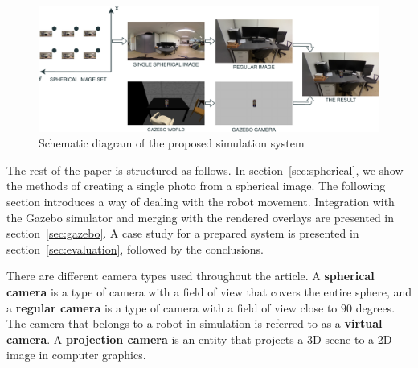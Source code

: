\documentclass{svproc}
\begin{document}
\begin{figure}[ht!]
\includegraphics[width=\textwidth]{img/drawio/flow.pdf}
\caption{Schematic diagram of the proposed simulation system}
\label{fig:flow}
\end{figure}

The rest of the paper is structured as follows. In section~\ref{sec:spherical}, we show the methods of creating
a single photo from a spherical image. The following section introduces a way of dealing with the robot movement.
Integration with the Gazebo simulator and merging with the rendered overlays are presented in section~\ref{sec:gazebo}.
A case study for a prepared system is presented in section~\ref{sec:evaluation}, followed by the conclusions.






There are different camera types used throughout the article. A \textbf{spherical camera} is a type of camera with a field of view that covers the entire sphere, and a \textbf{regular camera} is a type of camera with a field of view close to $90$ degrees.
The camera that belongs to a robot in simulation is referred to as a \textbf{virtual camera}.
A \textbf{projection camera} is an entity that projects a 3D scene to a 2D image in computer graphics.
\end{document}
